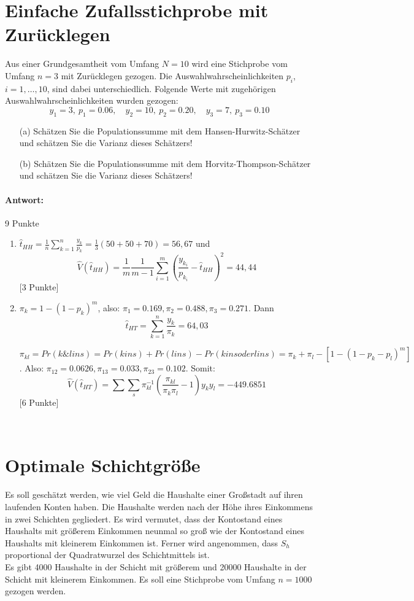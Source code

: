 \documentclass{article}
\begin{document}
\section{Einfache Zufallsstichprobe mit Zurücklegen}
Aus einer Grundgesamtheit vom Umfang $N=10$ wird eine Stichprobe vom Umfang $n=3$ mit Zurücklegen
gezogen. Die Auswahlwahrscheinlichkeiten $p_i$, $i=1, \ldots, 10$, sind dabei unterschiedlich.
Folgende Werte mit zugehörigen Auswahlwahrscheinlichkeiten wurden gezogen:\\
$$y_1 = 3, \ p_1 = 0.06, \quad y_2=10, \ p_2 = 0.20, \quad y_3 = 7, \ p_3 = 0.10$$
\begin{enumerate}
	\item[(a)] Schätzen Sie die Populationssumme mit dem Hansen-Hurwitz-Schätzer und schätzen Sie die
	Varianz dieses Schätzers!
	\item[(b)] Schätzen Sie die Populationssumme mit dem Horvitz-Thompson-Schätzer und schätzen Sie
	die Varianz dieses Schätzers!
\end{enumerate}
\paragraph{Antwort:}
\begin{solution} 9 Punkte
\begin{enumerate}
	\item $\hat{t}_{HH}=\frac{1}{n}\sum_{k=1}^n \frac{y_k}{p_k} = \frac{1}{3}(50+50+70)=56,67$ und $$\hat{V}(\hat{t}_{HH}) = \frac{1}{m}\frac{1}{m-1} \sum_{i=1}^m \left(\frac{y_{k_i}}{p_{k_i}}-\hat{t}_{HH}\right)^2 = 44,44$$ [3 Punkte]
	\item $\pi_k = 1-(1-p_k)^m$, also: $\pi_1 = 0.169, \pi_2 = 0.488, \pi_3=0.271$. Dann $$\hat{t}_{HT}=\sum_{k=1}^n \frac{y_k}{\pi_k}=64,03$$
	
	$\pi_{kl} =  Pr(k \& l in s)=Pr(k in s)+ Pr(l in s)-Pr (k in s oder l in s)=\pi_k + \pi_l - [1-(1-p_k -p_l)^m]$. Also: $\pi_{12}=0.0626, \pi_13 = 0.033,
		\pi_{23} = 0.102$. Somit:
		$$\hat{V}(\hat{t}_{HT})=\sum\sum_s \pi_{kl}^{-1} \left(\frac{\pi_{kl}}{\pi_k \pi_l}-1\right)y_k y_l = -449.6851$$ [6 Punkte]
\end{enumerate}
\end{solution}
~\newpage

\section{Optimale Schichtgröße}
Es soll geschätzt werden, wie viel Geld die Haushalte einer Großstadt auf ihren laufenden Konten haben.
Die Haushalte werden nach der Höhe ihres Einkommens in zwei Schichten gegliedert.
Es wird vermutet, dass der Kontostand eines Haushalts mit größerem Einkommen neunmal so groß wie der Kontostand
eines Haushalts mit kleinerem Einkommen ist. Ferner wird angenommen, dass $S_h$ proportional der
Quadratwurzel des Schichtmittels ist.\\
Es gibt 4000 Haushalte in der Schicht mit größerem und 20000 Haushalte in der Schicht mit kleinerem Einkommen.
Es soll eine Stichprobe vom Umfang $n=1000$ gezogen werden.
\end{document}
